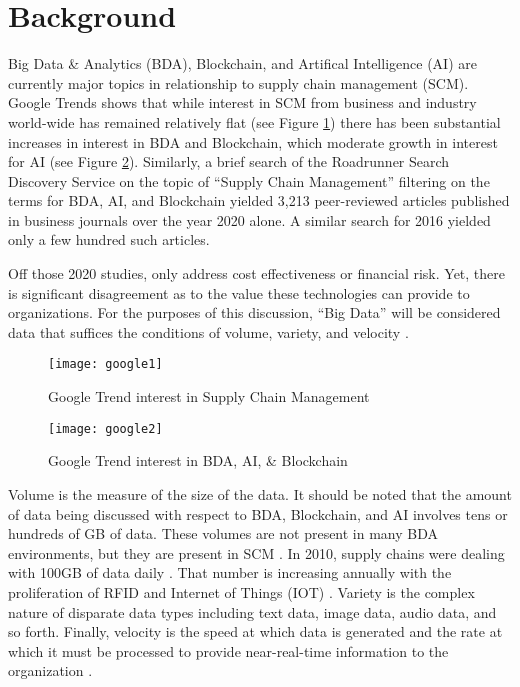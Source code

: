 \section{Background}

Big Data \& Analytics (BDA), Blockchain, and Artifical Intelligence (AI) are currently major topics in relationship to supply chain management (SCM). Google Trends shows that while interest in SCM from business and industry world-wide has remained relatively flat (see Figure \ref{fig:img1}) there has been substantial increases in interest in BDA and Blockchain, which moderate growth in interest for AI (see Figure \ref{fig:img2}). Similarly, a brief search of the Roadrunner Search Discovery Service on the topic of ``Supply Chain Management'' filtering on the terms for BDA, AI, and Blockchain yielded 3,213 peer-reviewed articles published in business journals over the year 2020 alone. A similar search for 2016 yielded only a few hundred such articles.

Off those 2020 studies, only address cost effectiveness or financial risk. Yet, there is significant disagreement as to the value these technologies can provide to organizations. For the purposes of this discussion, ``Big Data'' will be considered data that suffices the conditions of volume, variety, and velocity \parencite{hofmannBigDataSupply2017}.

\begin{figure}[h]
  \centering
  \texttt{[image: google1]}
  \caption{Google Trend interest in Supply Chain Management}
  \label{fig:img1}
\end{figure}

\begin{figure}[h]
  \centering
  \texttt{[image: google2]}
  \caption{Google Trend interest in BDA, AI, \& Blockchain}
  \label{fig:img2}
\end{figure}

Volume is the measure of the size of the data. It should be noted that the amount of data being discussed with respect to BDA, Blockchain, and AI involves tens or hundreds of GB of data. These volumes are not present in many BDA environments, but they are present in SCM \parencite{appuswamyNobodyEverGot2013}. In 2010, supply chains were dealing with 100GB of data daily \parencite{theeconomistDataDeluge2010}. That number is increasing annually with the proliferation of RFID and Internet of Things (IOT) \parencite{valuatesreportsRFIDMarketSize2020}. Variety is the complex nature of disparate data types including text data, image data, audio data, and so forth. Finally, velocity is the speed at which data is generated and the rate at which it must be processed to provide near-real-time information to the organization \parencite{hofmannBigDataSupply2017}.

